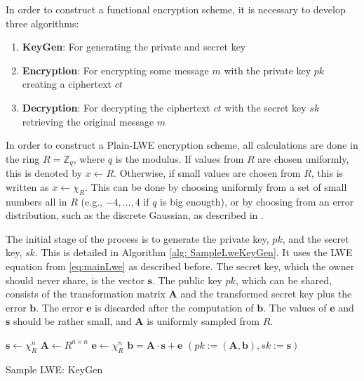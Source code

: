 In order to construct a functional encryption scheme, it is necessary to develop three algorithms:

\begin{enumerate}
  \item \textbf{KeyGen}: For generating the private and secret key
  \item \textbf{Encryption}: For encrypting some message $m$ with the private key $pk$ creating a ciphertext $ct$
  \item \textbf{Decryption}: For decrypting the ciphertext $ct$ with the secret key $sk$ retrieving the original message $m$
\end{enumerate}

In order to construct a Plain-LWE encryption scheme, all calculations are done in the ring $R = \mathbb{Z}_q$, where $q$ is the modulus. If values from $R$ are chosen uniformly, this is denoted by $x \leftarrow R$. Otherwise, if small values are chosen from $R$, this is written as $x \leftarrow \chi_R$. This can be done by choosing uniformly from a set of small numbers all in $R$ (e.g., ${-4,\ldots, 4}$ if $q$ is big enougth), or by choosing from an error distribution, such as the discrete Gaussian, as described in \cite{Regev2005OnLL}.

The initial stage of the process is to generate the private key, $pk$, and the secret key, $sk$. This is detailed in Algorithm \ref{alg: SampleLweKeyGen}. It uses the LWE equation from \ref{eq:mainLwe} as described before. The secret key, which the owner should never share, is the vector $\textbf{s}$. The public key $pk$, which can be shared, consists of the transformation matrix $\textbf{A}$ and the transformed secret key plus the error $\textbf{b}$. The error $\textbf{e}$ is discarded after the computation of $\textbf{b}$. The values of $\textbf{e}$ and $\textbf{s}$ should be rather small, and $\textbf{A}$ is uniformly sampled from $R$.

\begin{algorithm}[htb]
  \begin{algorithmic}[1]
    \STATE $\textbf{s} \leftarrow \chi_R^n$
    \STATE $\textbf{A} \leftarrow R^{n \times n}$
    \STATE $\textbf{e} \leftarrow \chi_R^n$
    \STATE $\textbf{b} = \textbf{A}\cdot \textbf{s}+\textbf{e}$
    \RETURN $(pk:=(\textbf{A}, \textbf{b}), sk:=\textbf{s} )$
  \end{algorithmic}
  \caption{Sample LWE: KeyGen}
  \label{alg: SampleLweKeyGen}
\end{algorithm}

